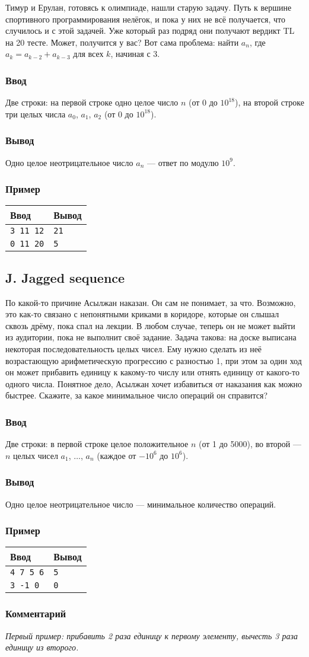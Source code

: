 \documentclass[10pt, a4paper]{article}
\newcommand{\informat}[1]
{
	\subsubsection*{Ввод} #1
}
\newcommand{\outformat}[1]
{
	\subsubsection*{Вывод} #1
}
\newcommand{\examplee}[4]
{
	\subsubsection*{Пример}
	\noindent
	\begin{center}
	\begin{tabularx}{\linewidth}{|X|X|}
	\hline
	Ввод 	& Вывод  	\\
	\hline
	{\tt #1} & {\tt #2}	\\
	\hline
	{\tt #3} & {\tt #4}	\\
	\hline
	\end{tabularx}
	\end{center}
}
\newcommand{\excomm}[1]
{
	\subsubsection*{Комментарий}
	\textit{#1}
}
\begin{document}
Тимур и Ерулан, готовясь к олимпиаде, нашли старую задачу. Путь к вершине спортивного программирования нелёгок, и пока у них не всё получается, что случилось и с этой задачей. Уже который раз подряд они получают вердикт TL на 20 тесте. Может, получится у вас? Вот сама проблема: найти $a_n$, где $a_k = a_{k-2} + a_{k-3}$ для всех $k$, начиная с 3.

\informat{Две строки: \newline на первой строке одно целое число $n$ (от 0 до $10^{18}$), на второй строке три целых числа $a_0$, $a_1$, $a_2$ (от 0 до $10^{18}$).}

\outformat{Одно целое неотрицательное число $a_n$ --- ответ по модулю $10^9$.}

\examplee{3 \newline 10 11 12}{21}{0 \newline 5 11 20}{5}



\subsection*{J. Jagged sequence}

По какой-то причине Асылжан наказан. Он сам не понимает, за что. Возможно, это как-то связано с непонятными криками в коридоре, которые он слышал сквозь дрёму, пока спал на лекции. В любом случае, теперь он не может выйти из аудитории, пока не выполнит своё задание. Задача такова: на доске выписана некоторая последовательность целых чисел. Ему нужно сделать из неё возрастающую арифметическую прогрессию с разностью 1, при этом за один ход он может прибавить единицу к какому-то числу или отнять единицу от какого-то одного числа. Понятное дело, Асылжан хочет избавиться от наказания как можно быстрее. Скажите, за какое минимальное число операций он справится?

\informat{Две строки: \newline в первой строке целое положительное $n$ (от 1 до 5000), во второй --- $n$ целых чисел $a_1$, $\dots$, $a_n$ (каждое от $-10^6$ до $10^6$).}

\outformat{Одно целое неотрицательное число --- минимальное количество операций.}

\examplee{4 \newline 1 7 5 6}{5}{3 \newline -2 -1 0}{0}

\excomm{Первый пример: прибавить 2 раза единицу к первому элементу, вычесть 3 раза единицу из второго.}
\end{document}
